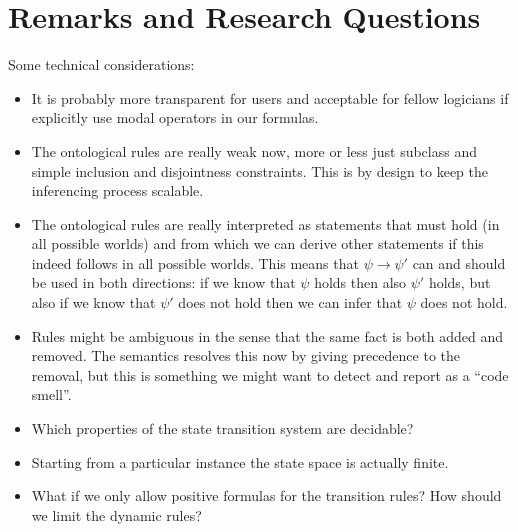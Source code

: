 \documentclass[11pt]{amsart}
\begin{document}
\section{Remarks and Research Questions}

Some technical considerations:

\begin{itemize}

\item It is probably more transparent for users and acceptable for fellow logicians if explicitly use modal operators in our formulas.

\item The ontological rules are really weak now, more or less just subclass and simple inclusion and disjointness constraints. This is by design to keep the inferencing process scalable.

\item The ontological rules are really interpreted as statements that must hold (in all possible worlds) and from which we can derive other statements if this indeed follows in all possible worlds. This means that $\psi \to \psi'$ can and should be used in both directions: if we know that $\psi$ holds then also $\psi'$ holds, but also if we know that $\psi'$ does not hold then we can infer that $\psi$ does not hold.

\item Rules might be ambiguous in the sense that the same fact is both added and removed. The semantics resolves this now by giving precedence to the removal, but this is something we might want to detect and report as a ``code smell''.

\item Which properties of the state transition system are decidable?

\item Starting from a particular instance the state space is actually finite.

\item What if we only allow positive formulas for the transition rules? How should we limit the dynamic rules? 

\end{itemize}
\end{document}
